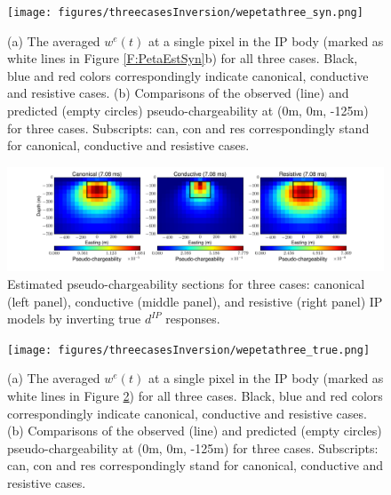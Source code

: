 \documentclass[a4paper, 11pt]{article}
\newcommand{\dip}{d^{IP}}
\begin{document}
\begin{figure}[htb]
  \centering  \texttt{[image: figures/threecasesInversion/wepetathree\_syn.png]}
  \caption{(a) The averaged $w^e(t)$ at a single pixel in the IP body (marked as white lines in Figure \ref{F:PetaEstSyn}b) for all three cases. Black, blue and red colors correspondingly indicate canonical, conductive and resistive cases. (b) Comparisons of the observed (line) and predicted (empty circles) pseudo-chargeability at (0m, 0m, -125m) for three cases. Subscripts: can, con and res correspondingly stand for canonical, conductive and resistive cases. }
  \label{F:wepetathree_syn}
\end{figure}

\begin{figure}[htb]
  \centering \includegraphics[height=0.2\textheight]{figures/threecasesInversion/PetaEst_True.png}
  \caption{Estimated pseudo-chargeability sections for three cases: canonical (left panel), conductive (middle panel), and resistive (right panel) IP models by inverting true $\dip$ responses.}
  \label{F:PetaEst_True}
\end{figure}

\begin{figure}[htb]
  \centering  \texttt{[image: figures/threecasesInversion/wepetathree\_true.png]}
  \caption{(a) The averaged $w^e(t)$ at a single pixel in the IP body (marked as white lines in Figure \ref{F:PetaEst_True}) for all three cases. Black, blue and red colors correspondingly indicate canonical, conductive and resistive cases. (b) Comparisons of the observed (line) and predicted (empty circles) pseudo-chargeability at (0m, 0m, -125m) for three cases. Subscripts: can, con and res correspondingly stand for canonical, conductive and resistive cases. }
  \label{F:wepetathree_true}
\end{figure}
\clearpage
\end{document}
